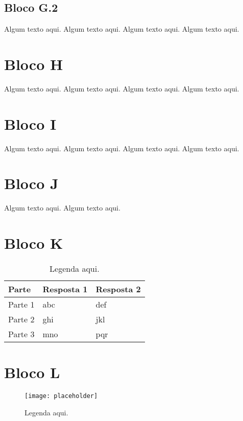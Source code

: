 \subsection{Bloco G.2}

\begin{example}[Nome]
Algum texto aqui. Algum texto aqui. Algum texto aqui. Algum texto aqui. 
\end{example}

\section{Bloco H}

\begin{exercise}
Algum texto aqui. Algum texto aqui. Algum texto aqui. Algum texto aqui. 
\end{exercise}

\section{Bloco I}

\begin{problem}
Algum texto aqui. Algum texto aqui. Algum texto aqui. Algum texto aqui. 
\end{problem}

\section{Bloco J}

\begin{vocabulary}[Nome]
Algum texto aqui. Algum texto aqui. 
\end{vocabulary}

\section{Bloco K}

\begin{table}[h]
\centering
\begin{tabular}{l l l}
\toprule
\textbf{Parte} & \textbf{Resposta 1} & \textbf{Resposta 2}\\
\midrule
Parte 1 & abc & def \\
Parte 2 & ghi & jkl \\
Parte 3 & mno & pqr \\
\bottomrule
\end{tabular}
\caption{Legenda aqui.}
\end{table}

\section{Bloco L}

\begin{figure}[h]
\texttt{[image: placeholder]}
\caption{Legenda aqui.}
\label{fig:mesh}
\end{figure}